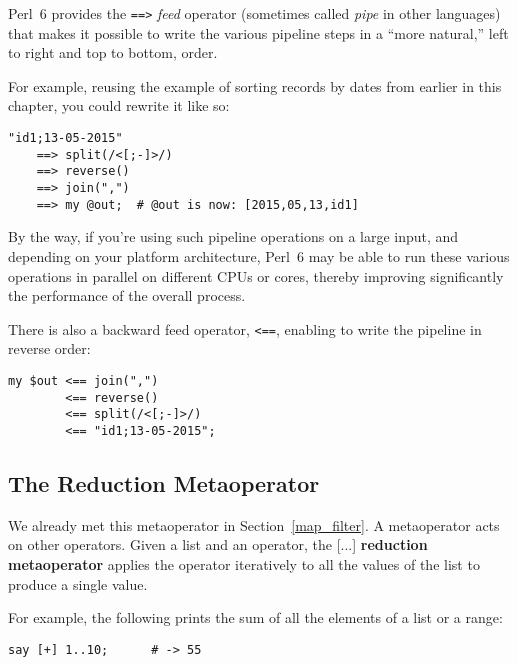 Perl~6 provides the \verb'==>' \emph{feed} operator 
(sometimes called \emph{pipe} in other languages) 
that makes it possible to write the various pipeline 
steps in a ``more natural,'' left to right and top to bottom, order.
\ifplastex \else
{}
\fi

For example, reusing the example of sorting records 
by dates from earlier in this chapter, you could rewrite 
it like so:

\begin{verbatim}
"id1;13-05-2015" 
    ==> split(/<[;-]>/) 
    ==> reverse() 
    ==> join(",") 
    ==> my @out;  # @out is now: [2015,05,13,id1]
\end{verbatim}

By the way, if you're using such pipeline operations on 
a large input, and depending on your platform 
architecture, Perl~6 may be able to run these 
various operations in parallel on different CPUs or cores, 
thereby improving significantly the performance 
of the overall process.

There is also a backward feed operator, \verb'<==', 
enabling to write the pipeline in reverse order:
\ifplastex \else
{}
\fi

\begin{verbatim}
my $out <== join(",") 
        <== reverse() 
        <== split(/<[;-]>/) 
        <== "id1;13-05-2015";
\end{verbatim}


\subsection{The Reduction Metaoperator}

We already met this metaoperator in Section~\ref{map_filter}. 
A metaoperator acts on other operators. Given 
a list and an operator, the [...] {\bf reduction metaoperator} 
applies the operator iteratively to all the values of the
list to produce a single value.

For example, the following prints the sum of all the 
elements of a list or a range:

\begin{verbatim}
say [+] 1..10;      # -> 55
\end{verbatim}

